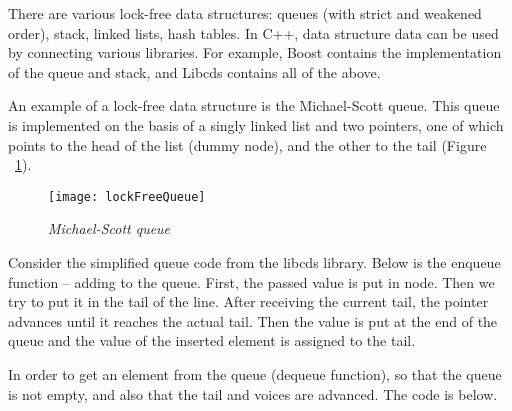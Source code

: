 {\begin{itemize}
	\end{itemize}
	\par There are various lock-free data structures: queues (with strict and weakened order), stack, linked lists, hash tables. In C++, data structure data can be used by connecting various libraries. For example, Boost contains the implementation of the queue and stack, and Libcds contains all of the above.
	\par An example of a lock-free data structure is the Michael-Scott queue. This queue is implemented on the basis of a singly linked list and two pointers, one of which points to the head of the list (dummy node), and the other to the tail (Figure ~\ref{lockFreeQueue:image}).
	\begin{figure}[H]
		\texttt{[image: lockFreeQueue]}
		\caption{\textit{Michael-Scott queue}}
		\label{lockFreeQueue:image}
	\end{figure}
	\par Consider the simplified queue code from the libcds library. Below is the enqueue function – adding to the queue. First, the passed value is put in node. Then we try to put it in the tail of the line. After receiving the current tail, the pointer advances until it reaches the actual tail. Then the value is put at the end of the queue and the value of the inserted element is assigned to the tail.
	\begin{figure}[H]
		
	\end{figure}
	\par In order to get an element from the queue (dequeue function), so that the queue is not empty, and also that the tail and voices are advanced. The code is below.
	\begin{figure}[H]
		
	\end{figure}
}